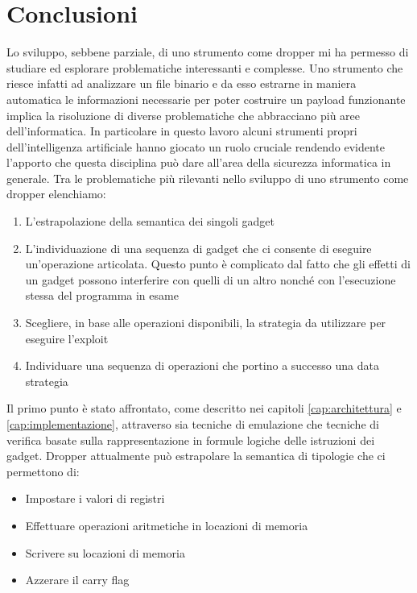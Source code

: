 \chapter{Conclusioni}

Lo sviluppo, sebbene parziale, di uno strumento come dropper mi ha
permesso di studiare ed esplorare problematiche interessanti e
complesse. Uno strumento che riesce infatti ad analizzare un file
binario e da esso estrarne in maniera automatica le informazioni
necessarie per poter costruire un payload funzionante implica la
risoluzione di diverse problematiche che abbracciano più aree
dell'informatica. In particolare in questo lavoro alcuni strumenti
propri dell'intelligenza artificiale hanno giocato un ruolo cruciale
rendendo evidente l'apporto che questa disciplina può dare all'area
della sicurezza informatica in generale. Tra le problematiche più
rilevanti nello sviluppo di uno strumento come dropper elenchiamo:

\begin{enumerate}
\item L'estrapolazione della semantica dei singoli gadget
\item L'individuazione di una sequenza di gadget che ci consente di
  eseguire un'operazione articolata. Questo punto è complicato dal
  fatto che gli effetti di un gadget possono interferire con quelli di
  un altro nonché con l'esecuzione stessa del programma in esame
\item Scegliere, in base alle operazioni disponibili, la strategia da
  utilizzare per eseguire l'exploit
\item Individuare una sequenza di operazioni che portino a successo una
  data strategia
\end{enumerate}

Il primo punto è stato affrontato, come descritto nei capitoli
\ref{cap:architettura} e \ref{cap:implementazione}, attraverso sia
tecniche di emulazione che tecniche di verifica basate sulla
rappresentazione in formule logiche delle istruzioni dei
gadget. Dropper attualmente può estrapolare la semantica di tipologie
che ci permettono di:

\begin{itemize}
\item Impostare i valori di registri
\item Effettuare operazioni aritmetiche in locazioni di memoria
\item Scrivere su locazioni di memoria
\item Azzerare il carry flag
\end{itemize}

